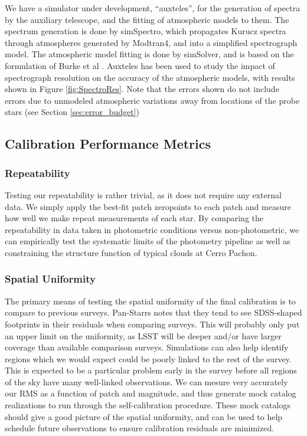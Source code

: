 \documentclass[12pt,preprint]{aastex}
\begin{document}
We have a simulator under development, ``auxteles'', for the generation of spectra by the auxiliary telescope, 
and the fitting of atmospheric 
models to them.  The spectrum generation is done by simSpectro, which propagates Kurucz spectra through
atmospheres generated by Modtran4, and into a simplified spectrograph model.  The atmospheric model fitting is done by
simSolver, and is based on the formulation of Burke et al \citep{Burke2010b}.  Auxteles has been used to study
the impact of spectrograph resolution on the accuracy of the atmospheric models, with results shown in Figure \ref{fig:SpectroRes}.
Note that the errors shown do not include errors due to unmodeled atmospheric variations away from locations of the 
probe stars (see Section \ref{sec:error_budget})

\subsection{Calibration Performance Metrics}

\subsubsection{Repeatability}

Testing our repeatability is rather trivial, as it does not require
any external data.  We simply apply the best-fit patch zeropoints to
each patch and measure how well we make repeat measurements of each
star.  By comparing the repeatability in data taken in photometric
conditions versus non-photometric, we can empirically test the
systematic limits of the photometry pipeline as well as constraining the
structure function of typical clouds at Cerro Pachon.

\subsubsection{Spatial Uniformity}

The primary means of testing the spatial uniformity of the final
calibration is to compare to previous surveys.  Pan-Starrs notes that
they tend to see SDSS-shaped footprints in their residuals when
comparing surveys.  This will probably only put an upper limit on the
uniformity, as LSST will be deeper and/or have larger coverage than
available comparison surveys.  Simulations can also help identify
regions which we would expect could be poorly linked to the rest of
the survey.  This is expected to be a particular problem early in the
survey before all regions of the sky have many well-linked
observations.  We can mesure very accurately our RMS as a function of
patch and magnitude, and thus generate mock catalog realizations to
run through the self-calibration procedure.  These mock catalogs
should give a good picture of the spatial uniformity, and can be used
to help schedule future observations to ensure calibration residuals
are minimized.
\end{document}
